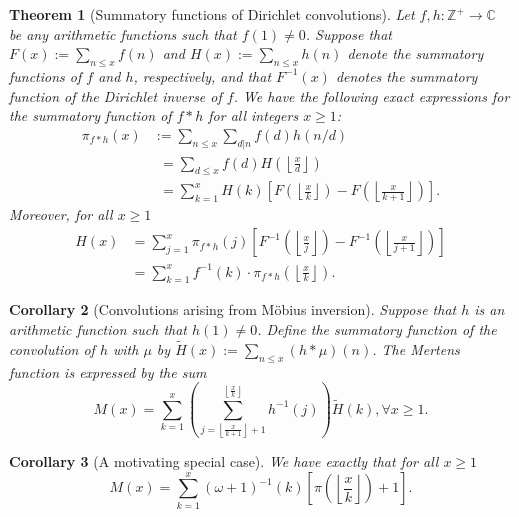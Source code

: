 \documentclass[11pt,reqno,a4letter]{article}
\numberwithin{figure}{section}
\numberwithin{table}{section}
\newcommand{\floor}[1]{\left\lfloor #1 \right\rfloor}
\newcommand{\Floor}[2]{\ensuremath{\left\lfloor \frac{#1}{#2} \right\rfloor}}
\theoremstyle{plain}
\newtheorem{theorem}{Theorem}
\newtheorem{cor}[theorem]{Corollary}
\numberwithin{theorem}{section}
\theoremstyle{definition}
\begin{document}
\begin{theorem}[Summatory functions of Dirichlet convolutions] 
\label{theorem_SummatoryFuncsOfDirCvls} 
Let $f,h: \mathbb{Z}^{+} \rightarrow \mathbb{C}$ be any arithmetic functions such that $f(1) \neq 0$. 
Suppose that $F(x) := \sum_{n \leq x} f(n)$ and $H(x) := \sum_{n \leq x} h(n)$ denote the summatory 
functions of $f$ and $h$, respectively, and that $F^{-1}(x)$ denotes the summatory function of the 
Dirichlet inverse of $f$. We have the following exact expressions for the 
summatory function of $f \ast h$ for all integers $x \geq 1$: 
\begin{align*} 
\pi_{f \ast h}(x) & := \sum_{n \leq x} \sum_{d|n} f(d) h(n/d) \\ 
     & \phantom{:}= \sum_{d \leq x} f(d) H\left(\Floor{x}{d}\right) \\ 
     & \phantom{:}= \sum_{k=1}^{x} H(k) \left[F\left(\Floor{x}{k}\right) - 
     F\left(\Floor{x}{k+1}\right)\right]. 
\end{align*} 
Moreover, for all $x \geq 1$ 
\begin{align*} 
H(x) & = \sum_{j=1}^{x} \pi_{f \ast h}(j) \left[F^{-1}\left(\Floor{x}{j}\right) - 
     F^{-1}\left(\Floor{x}{j+1}\right)\right] \\ 
     & = \sum_{k=1}^{x} f^{-1}(k) \cdot \pi_{f \ast h}\left(\Floor{x}{k}\right). 
\end{align*} 
\end{theorem} 

\begin{cor}[Convolutions arising from M\"obius inversion] 
\label{cor_CvlGAstMu} 
Suppose that $h$ is an arithmetic function such that 
$h(1) \neq 0$. Define the summatory function of 
the convolution of $h$ with $\mu$ by $\widetilde{H}(x) := \sum_{n \leq x} (h \ast \mu)(n)$. 
The Mertens function is expressed by the sum 
\[
M(x) = \sum_{k=1}^{x} \left(\sum_{j=\floor{\frac{x}{k+1}}+1}^{\floor{\frac{x}{k}}} h^{-1}(j)\right) 
     \widetilde{H}(k), \forall x \geq 1. 
\]
\end{cor} 

\begin{cor}[A motivating special case] 
\label{cor_Mx_gInvnPixk_formula} 
We have exactly that for all $x \geq 1$ 
\begin{equation} 
\label{eqn_Mx_gInvnPixk_formula} 
M(x) = \sum_{k=1}^{x} (\omega+1)^{-1}(k) \left[\pi\left(\Floor{x}{k}\right) + 1\right]. 
\end{equation} 
\end{cor} 
\end{document}
